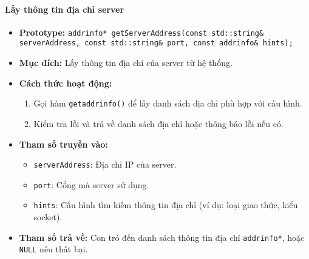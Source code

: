 \paragraph{\textbf{Lấy thông tin địa chỉ server}}
\begin{itemize}
    \item \textbf{Prototype:} \texttt{addrinfo* getServerAddress(const std::string\& serverAddress, const std::string\& port, const addrinfo\& hints);}
    
    \item \textbf{Mục đích:} Lấy thông tin địa chỉ của server từ hệ thống.
    
    \item \textbf{Cách thức hoạt động:} 
    \begin{enumerate}
        \item Gọi hàm \texttt{getaddrinfo()} để lấy danh sách địa chỉ phù hợp với cấu hình.
        \item Kiểm tra lỗi và trả về danh sách địa chỉ hoặc thông báo lỗi nếu có.
    \end{enumerate}
    
    \item \textbf{Tham số truyền vào:} 
    \begin{itemize}
        \item \texttt{serverAddress}: Địa chỉ IP của server.
        \item \texttt{port}: Cổng mà server sử dụng.
        \item \texttt{hints}: Cấu hình tìm kiếm thông tin địa chỉ (ví dụ: loại giao thức, kiểu socket).
    \end{itemize}
    
    \item \textbf{Tham số trả về:} Con trỏ đến danh sách thông tin địa chỉ \texttt{addrinfo*}, hoặc \texttt{NULL} nếu thất bại.
\end{itemize}

